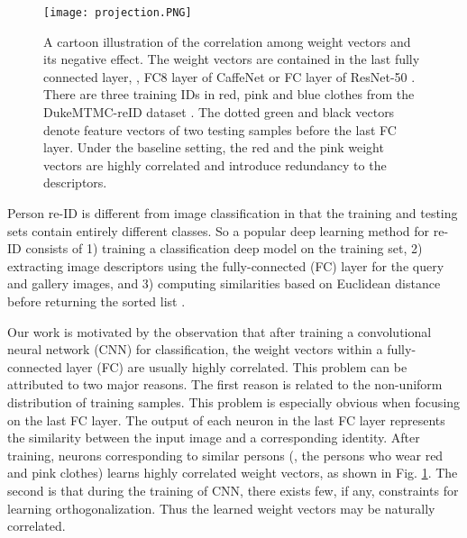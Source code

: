 \documentclass[10pt,twocolumn,letterpaper]{article}
\begin{document}
\begin{figure}[t]
\begin{center}
\texttt{[image: projection.PNG]}
\end{center}
   \caption{A cartoon illustration of the correlation among weight vectors and its negative effect. The weight vectors are contained in the last fully connected layer, \eg, FC8 layer of CaffeNet \cite{DBLP:conf/nips/KrizhevskySH12} or  FC layer of ResNet-50 \cite{DBLP:conf/cvpr/HeZRS16}. There are three training IDs in red, pink and blue clothes from the DukeMTMC-reID dataset \cite{ristani2016performance}. The dotted green and black vectors denote feature vectors of two testing samples before the last FC layer. Under the baseline setting, the red and the pink weight vectors are highly correlated and introduce redundancy to the descriptors.}
\label{fig:motivation}
\end{figure}
Person re-ID is different from image classification in that the training and testing sets contain entirely different classes. So a popular deep learning method for re-ID consists of 1) training a classification deep model on the training set, 2) extracting image descriptors using the fully-connected (FC) layer for the query and gallery images, and 3) computing similarities based on Euclidean distance before returning the sorted list \cite{DBLP:journals/corr/ZhengYH16,DBLP:journals/corr/ZhengHLY17,DBLP:conf/cvpr/XiaoLOW16,geng2016deep}. 

Our work is motivated by the observation that after training a convolutional neural network (CNN) for classification, the weight vectors within a fully-connected layer (FC) are usually highly correlated. This problem can be attributed to two major reasons. The first reason is related to the non-uniform distribution of training samples. This problem is especially obvious when focusing on the last FC layer. The output of each neuron in the last FC layer represents the similarity between the input image and a corresponding identity. After training, neurons corresponding to similar persons (\ie, the persons who wear red and pink clothes) learns highly correlated weight vectors, as shown in Fig. \ref{fig:motivation}. The second is that during the training of CNN, there exists few, if any, constraints for learning orthogonalization. Thus the learned weight vectors may be naturally correlated.
\end{document}
